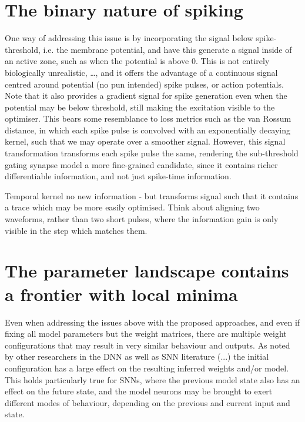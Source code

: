 \documentclass[mphil,deptreport,ai]{infthesis} %
\begin{document}
\section{The binary nature of spiking}
One way of addressing this issue is by incorporating the signal below spike-threshold, i.e. the membrane potential, and have this generate a signal inside of an active zone, such as when the potential is above 0. This is not entirely biologically unrealistic, …, and it offers the advantage of a continuous signal centred around potential (no pun intended) spike pulses, or action potentials. Note that it also provides a gradient signal for spike generation even when the potential may be below threshold, still making the excitation visible to the optimiser.
This bears some resemblance to loss metrics such as the van Rossum distance, in which each spike pulse is convolved with an exponentially decaying kernel, such that we may operate over a smoother signal. However, this signal transformation transforms each spike pulse the same, rendering the sub-threshold gating synapse model a more fine-grained candidate, since it contains richer differentiable information, and not just spike-time information.

Temporal kernel no new information - but transforms signal such that it contains a trace which may be more easily optimised. Think about aligning two waveforms, rather than two short pulses, where the information gain is only visible in the step which matches them.


\section{The parameter landscape contains a frontier with local minima}
Even when addressing the issues above with the proposed approaches, and even if fixing all model parameters but the weight matrices, there are multiple weight configurations that may result in very similar behaviour and outputs.
As noted by other researchers in the DNN as well as SNN literature (...) the initial configuration has a large effect on the resulting inferred weights and/or model. This holds particularly true for SNNs, where the previous model state also has an effect on the future state, and the model neurons may be brought to exert different modes of behaviour, depending on the previous and current input and state.
\end{document}
